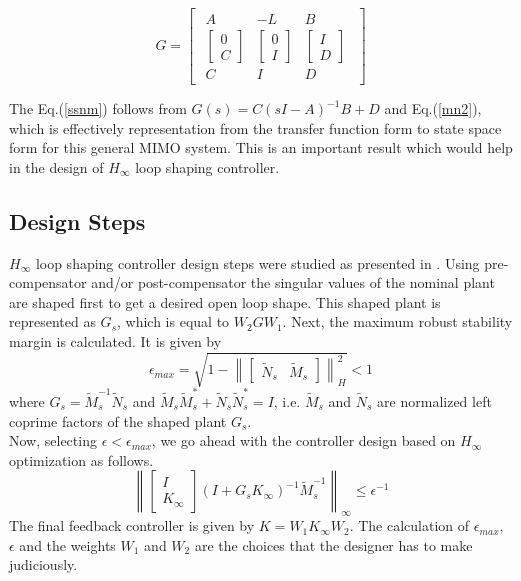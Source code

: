 \documentclass[a4paper,12pt]{article}
\newcommand\norm[1]{\left\lVert#1\right\rVert}
\begin{document}
	\begin{equation}
	G=\begin{bmatrix}
	\begin{array}{c|cc}
	A & -L & B\\ \hline
	\begin{bmatrix}
	0 \\ C
	\end{bmatrix}
	 & \begin{bmatrix}
	 0 \\I
	 \end{bmatrix}
	  & \begin{bmatrix}
	  I \\D
	  \end{bmatrix} \\
	  C & I & D
	\end{array}
	\end{bmatrix}
	\label{ssnm}
	\end{equation}
	
	
	
	
	The Eq.(\ref{ssnm}) follows from $G(s) = C(sI-A)^{-1}B + D$ and Eq.(\ref{mn2}), which is effectively representation from the transfer function form to state space form for this general MIMO system. This is an important result which would help in the design of $H_{\infty}$  loop shaping controller. \\
 	\subsection{Design Steps}	
	$H_{\infty}$  loop shaping controller design steps were studied as presented in \cite{book}. Using pre-compensator and/or post-compensator the singular values of the nominal plant are shaped first to get a desired open loop shape. This shaped plant is represented as $G_{s}$, which is equal to $W_{2}GW_{1}$. Next, the maximum robust stability margin is calculated. It is given by
	\begin{equation}
		\epsilon_{max} = \sqrt{1-\norm{\begin{bmatrix}
		\tilde{N}_{s} & \tilde{M}_{s}\end{bmatrix}}_{H}^{2}} < 1
	\end{equation}
	where $G_{s} = \tilde{M}_{s}^{-1}\tilde{N}_{s}$ and $\tilde{M}_{s}\tilde{M}_{s}^{*} + \tilde{N}_{s}\tilde{N}_{s}^{*} = I $, i.e. $\tilde{M}_{s}$ and $\tilde{N}_{s}$ are normalized left coprime factors of the shaped plant $G_{s}$.\\
	Now, selecting $\epsilon < \epsilon_{max}$, we go ahead with the controller design based on $H_{\infty}$ optimization as follows.
	\begin{equation}
	\norm{\begin{bmatrix}
	I \\ K_{\infty}
	\end{bmatrix}
	(I+G_{s}K_{\infty})^{-1}\tilde{M}_{s}^{-1}}_{\infty} \leq \epsilon^{-1}
	\end{equation}
	The final feedback controller is given by $K=W_{1}K_{\infty}W_{2}$. The calculation of $\epsilon_{max}$, $\epsilon$ and the weights $W_{1}$ and $W_{2}$ are the choices that the designer has to make judiciously.
\end{document}
